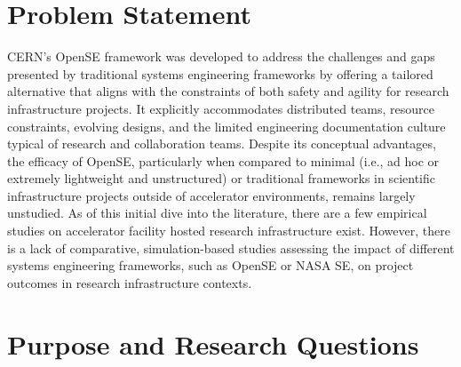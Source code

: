 \section{Problem Statement}
\label{sect:problem}
CERN’s OpenSE framework \cite{cern2016opense} was developed to address the challenges and gaps presented by traditional systems engineering frameworks by offering a tailored alternative that aligns with the constraints of both safety and agility for research infrastructure projects. 
It explicitly accommodates distributed teams, resource constraints, evolving designs, and the limited engineering documentation culture typical of research and collaboration teams. 
Despite its conceptual advantages, the efficacy of OpenSE, particularly when compared to minimal (i.e., ad hoc or extremely lightweight and unstructured) or traditional frameworks in scientific infrastructure projects outside of accelerator environments, remains largely unstudied. 
As of this initial dive into the literature, there are a few empirical studies on accelerator facility hosted research infrastructure exist. 
However, there is a lack of comparative, simulation-based studies assessing the impact of different systems engineering frameworks, such as OpenSE or NASA SE, on project outcomes in research infrastructure contexts.
\section{Purpose and Research Questions}
\label{sect:purpose&questions}
